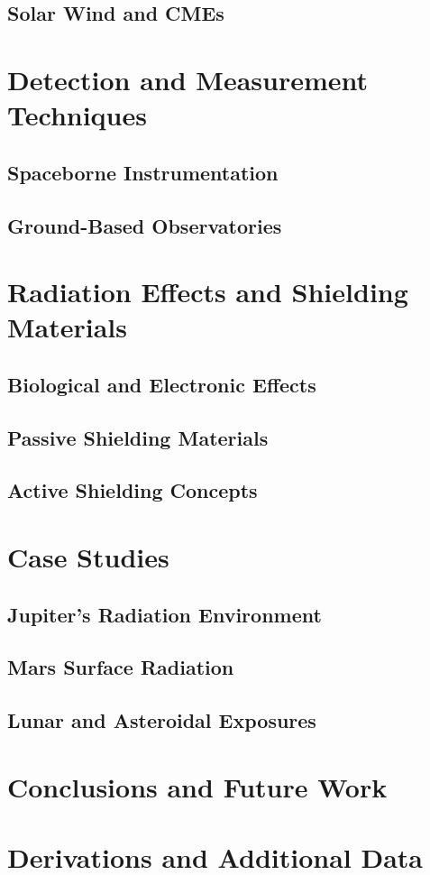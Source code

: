 \documentclass[12pt]{report}
\begin{document}
\section{Solar Wind and CMEs}

\chapter{Detection and Measurement Techniques}
\section{Spaceborne Instrumentation}
\section{Ground-Based Observatories}

\chapter{Radiation Effects and Shielding Materials}
\section{Biological and Electronic Effects}
\section{Passive Shielding Materials}
\section{Active Shielding Concepts}

\chapter{Case Studies}
\section{Jupiter’s Radiation Environment}
\section{Mars Surface Radiation}
\section{Lunar and Asteroidal Exposures}

\chapter{Conclusions and Future Work}

\appendix
\chapter{Derivations and Additional Data}

\end{document}

